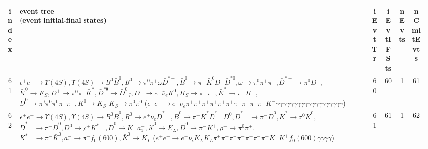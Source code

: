 \documentclass[landscape]{article}
\begin{document}
\clearpage

\begin{table}[htbp!]
\small
\centering
\begin{tabular}{|c|>{\centering}p{18cm}|c|c|c|c|}
\hline
index & \thead{event tree \\ (event initial-final states)} & iEvtTr & iEvtIFSts & nEvts & nCmltEvts \\
\hline
61 & \makecell{ $ 
e^{+} e^{-} \rightarrow \Upsilon(4S) ,
\Upsilon(4S) \rightarrow B^{0} \bar{B}^{0} ,
B^{0} \rightarrow \pi^{0} \pi^{+} \omega \bar{D}^{*-} ,
\bar{B}^{0} \rightarrow \pi^{-} \bar{K}^{0} D^{+} \bar{D}^{*0} ,
\omega \rightarrow \pi^{0} \pi^{+} \pi^{-} ,
\bar{D}^{*-} \rightarrow \pi^{0} D^{-} ,
$ \\ $
\bar{K}^{0} \rightarrow K_{S} ,
D^{+} \rightarrow \pi^{0} \pi^{+} \bar{K}^{*} ,
\bar{D}^{*0} \rightarrow \bar{D}^{0} \gamma ,
D^{-} \rightarrow e^{-} \bar{\nu}_{e} K^{0} ,
K_{S} \rightarrow \pi^{+} \pi^{-} ,
\bar{K}^{*} \rightarrow \pi^{+} K^{-} ,
$ \\ $
\bar{D}^{0} \rightarrow \pi^{0} \pi^{0} \pi^{0} \pi^{+} \pi^{-} ,
K^{0} \rightarrow K_{S} ,
K_{S} \rightarrow \pi^{0} \pi^{0} 
$ \\ ($
e^{+} e^{-} \rightarrow e^{-} \bar{\nu}_{e} \pi^{+} \pi^{+} \pi^{+} \pi^{+} \pi^{+} \pi^{+} \pi^{-} \pi^{-} \pi^{-} \pi^{-} K^{-} \gamma \gamma \gamma \gamma \gamma \gamma \gamma \gamma \gamma \gamma \gamma \gamma \gamma \gamma \gamma \gamma \gamma \gamma \gamma 
$) } & 60 & 60 & 1 & 61 \\
\hline
62 & \makecell{ $ 
e^{+} e^{-} \rightarrow \Upsilon(4S) ,
\Upsilon(4S) \rightarrow B^{0} \bar{B}^{0} ,
B^{0} \rightarrow e^{+} \nu_{e} \bar{D}^{*-} ,
\bar{B}^{0} \rightarrow \pi^{+} \bar{K}^{*} \bar{D}^{*-} D^{0} ,
\bar{D}^{*-} \rightarrow \pi^{-} \bar{D}^{0} ,
\bar{K}^{*} \rightarrow \pi^{0} \bar{K}^{0} ,
$ \\ $
\bar{D}^{*-} \rightarrow \pi^{-} \bar{D}^{0} ,
D^{0} \rightarrow \rho^{+} K^{*-} ,
\bar{D}^{0} \rightarrow K^{+} a_{1}^{-} ,
\bar{K}^{0} \rightarrow K_{L} ,
\bar{D}^{0} \rightarrow \pi^{-} K^{+} ,
\rho^{+} \rightarrow \pi^{0} \pi^{+} ,
$ \\ $
K^{*-} \rightarrow \pi^{-} \bar{K}^{0} ,
a_{1}^{-} \rightarrow \pi^{-} f_{0}(600) ,
\bar{K}^{0} \rightarrow K_{L} 
$ \\ ($
e^{+} e^{-} \rightarrow e^{+} \nu_{e} K_{L} K_{L} \pi^{+} \pi^{+} \pi^{-} \pi^{-} \pi^{-} \pi^{-} \pi^{-} K^{+} K^{+} f_{0}(600) \gamma \gamma \gamma \gamma 
$) } & 61 & 61 & 1 & 62 \\

\end{tabular}
\end{table}
\end{document}

